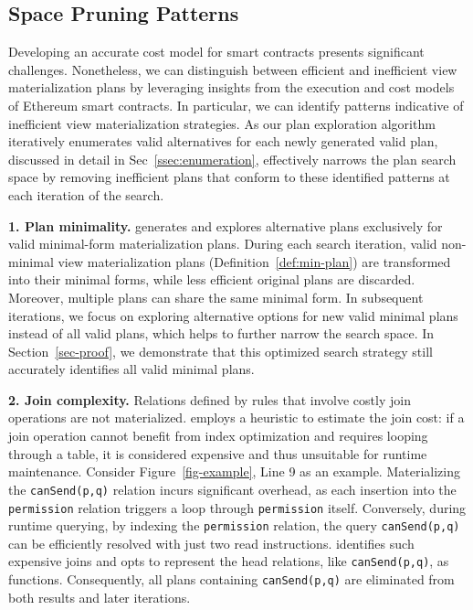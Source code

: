 \subsection{Space Pruning Patterns}
\label{ssec_pruning}

Developing an accurate cost model for smart contracts presents significant challenges. Nonetheless, we can distinguish between efficient and inefficient view materialization plans by leveraging insights from the execution and cost models of Ethereum smart contracts. In particular, we can identify patterns indicative of inefficient view materialization strategies. As our plan exploration algorithm iteratively enumerates valid alternatives for each newly generated valid plan, discussed in detail in Sec~\ref{ssec:enumeration}, \proto effectively narrows the plan search space by removing inefficient plans that conform to these identified patterns at each iteration of the search.

\noindent \textbf{1. Plan minimality.} 
\proto generates and explores alternative plans exclusively for valid minimal-form materialization plans.
During each search iteration, valid non-minimal view materialization plans (Definition~\ref{def:min-plan}) are transformed into their minimal forms, while less efficient original plans are discarded.
Moreover, multiple plans can share the same minimal form. In subsequent iterations, we focus on exploring alternative options for new valid minimal plans instead of all valid plans, which helps to further narrow the search space. In Section~\ref{sec-proof}, we demonstrate that this optimized search strategy still accurately identifies all valid minimal plans.


\noindent \textbf{2. Join complexity.} 
Relations defined by rules that involve costly join operations are not materialized. \proto employs a heuristic to estimate the join cost: if a join operation cannot benefit from index optimization and requires looping through a table, it is considered expensive and thus unsuitable for runtime maintenance. Consider Figure~\ref{fig-example}, Line 9 as an example. Materializing the {\sf \lstinline{canSend(p,q)}} relation incurs significant overhead, as each insertion into the \lstinline{permission} relation triggers a loop through \lstinline{permission} itself. Conversely, during runtime querying, by indexing the \lstinline{permission} relation, the query \lstinline{canSend(p,q)} can be efficiently resolved with just two read instructions. \proto identifies such expensive joins and opts to represent the head relations, like {\sf \lstinline{canSend(p,q)}}, as functions. Consequently, all plans containing {\sf \lstinline{canSend(p,q)}} are eliminated from both results and later iterations.

